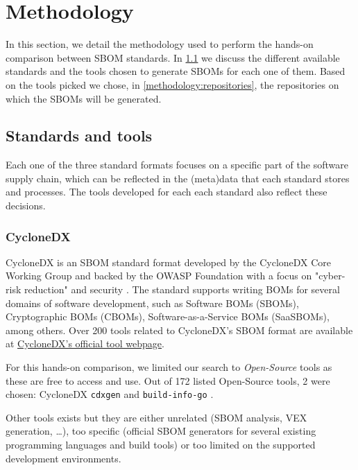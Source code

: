 \section{Methodology}

In this section, we detail the methodology used to perform the hands-on comparison between SBOM standards. In \ref{methodology:standards-tools} we discuss the different available standards and the tools chosen to generate SBOMs for each one of them. Based on the tools picked we chose, in \ref{methodology:repositories}, the repositories on which the SBOMs will be generated.

\subsection{Standards and tools} \label{methodology:standards-tools}

Each one of the three standard formats focuses on a specific part of the software supply chain, which can be reflected in the (meta)data that each standard stores and processes. The tools developed for each each standard also reflect these decisions. 

\subsubsection{CycloneDX}

CycloneDX \cite{standards:sbom:cyclonedx} is an SBOM standard format developed by the CycloneDX Core Working Group and backed by the OWASP Foundation with a focus on "cyber-risk reduction" \cite{standards:sbom:cyclonedx} and security \cite{article:sbom-study}. The standard supports writing BOMs for several domains of software development, such as Software BOMs (SBOMs), Cryptographic BOMs (CBOMs), Software-as-a-Service BOMs (SaaSBOMs), among others. Over 200 tools related to CycloneDX's SBOM format are available at \href{https://cyclonedx.org/tool-center/}{\underline{CycloneDX's official tool webpage}}. 

For this hands-on comparison, we limited our search to \emph{Open-Source} tools as these are free to access and use. Out of 172 listed Open-Source tools, 2 were chosen: CycloneDX \verb|cdxgen| \cite{repository:cyclonedx:cdxgen} and \verb|build-info-go| \cite{repository:cyclonedx:build-info-go}.

Other tools exists but they are either unrelated (SBOM analysis, VEX generation, \dots), too specific (official SBOM generators for several existing programming languages and build tools) or too limited on the supported development environments.

